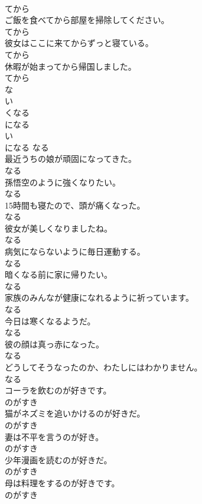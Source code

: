 \documentclass[8pt]{extreport}
\begin{document}
\begin{CJK}{UTF8}{min}
\\	てから
\\	ご飯を食べてから部屋を掃除してください。	
\\	てから
\\	彼女はここに来てからずっと寝ている。	
\\	てから
\\	休暇が始まってから帰国しました。	
\\	てから
\\	な
\\	い 
\\	くなる	
\\	になる	
\\	い
\\	になる	なる
\\	最近うちの娘が頑固になってきた。	
\\	なる
\\	孫悟空のように強くなりたい。	
\\	なる
\\	15時間も寝たので、頭が痛くなった。	
\\	なる
\\	彼女が美しくなりましたね。	
\\	なる
\\	病気にならないように毎日運動する。	
\\	なる
\\	暗くなる前に家に帰りたい。	
\\	なる
\\	家族のみんなが健康になれるように祈っています。	
\\	なる
\\	今日は寒くなるようだ。	
\\	なる
\\	彼の顔は真っ赤になった。	
\\	なる
\\	どうしてそうなったのか、わたしにはわかりません。	
\\	なる
\\	コーラを飲むのが好きです。	
\\	のがすき
\\	猫がネズミを追いかけるのが好きだ。	
\\	のがすき
\\	妻は不平を言うのが好き。	
\\	のがすき
\\	少年漫画を読むのが好きだ。	
\\	のがすき
\\	母は料理をするのが好きです。	
\\	のがすき

\end{CJK}
\end{document}
